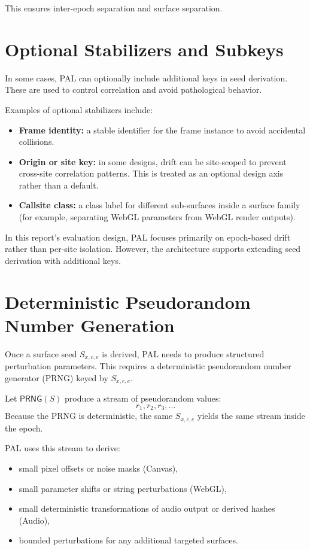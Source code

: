 \documentclass[11pt]{report}
\begin{document}
This ensures inter-epoch separation and surface separation.

\section{Optional Stabilizers and Subkeys}

In some cases, PAL can optionally include additional keys in seed derivation. These are used to control correlation and avoid pathological behavior.

Examples of optional stabilizers include:
\begin{itemize}
    \item \textbf{Frame identity:} a stable identifier for the frame instance to avoid accidental collisions.
    \item \textbf{Origin or site key:} in some designs, drift can be site-scoped to prevent cross-site correlation patterns. This is treated as an optional design axis rather than a default.
    \item \textbf{Callsite class:} a class label for different sub-surfaces inside a surface family (for example, separating WebGL parameters from WebGL render outputs).
\end{itemize}

In this report’s evaluation design, PAL focuses primarily on epoch-based drift rather than per-site isolation. However, the architecture supports extending seed derivation with additional keys.

\section{Deterministic Pseudorandom Number Generation}

Once a surface seed $S_{x,c,e}$ is derived, PAL needs to produce structured perturbation parameters. This requires a deterministic pseudorandom number generator (PRNG) keyed by $S_{x,c,e}$.

Let $\mathsf{PRNG}(S)$ produce a stream of pseudorandom values:
\[
r_1, r_2, r_3, \dots
\]
Because the PRNG is deterministic, the same $S_{x,c,e}$ yields the same stream inside the epoch.

PAL uses this stream to derive:
\begin{itemize}
    \item small pixel offsets or noise masks (Canvas),
    \item small parameter shifts or string perturbations (WebGL),
    \item small deterministic transformations of audio output or derived hashes (Audio),
    \item bounded perturbations for any additional targeted surfaces.
\end{itemize}
\end{document}
